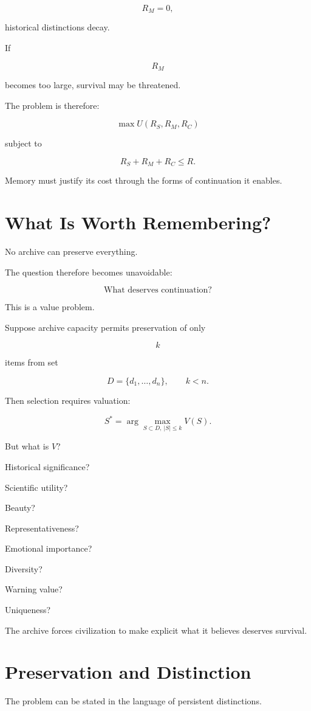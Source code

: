 \documentclass[11pt,oneside]{book}
\theoremstyle{definition}
\theoremstyle{remark}
\begin{document}
\[
R_M=0,
\]

historical distinctions decay.

If

\[
R_M
\]

becomes too large, survival may be threatened.

The problem is therefore:

\[
\max
U(R_S,R_M,R_C)
\]

subject to

\[
R_S+R_M+R_C\leq R.
\]

Memory must justify its cost through the forms of continuation it enables.

\section{What Is Worth Remembering?}

No archive can preserve everything.

The question therefore becomes unavoidable:

\[
\text{What deserves continuation?}
\]

This is a value problem.

Suppose archive capacity permits preservation of only

\[
k
\]

items from set

\[
D=\{d_1,\ldots,d_n\},
\qquad
k<n.
\]

Then selection requires valuation:

\[
S^\ast
=
\arg\max_{S\subset D,\ |S|\leq k}
V(S).
\]

But what is \(V\)?

Historical significance?

Scientific utility?

Beauty?

Representativeness?

Emotional importance?

Diversity?

Warning value?

Uniqueness?

The archive forces civilization to make explicit what it believes deserves survival.

\section{Preservation and Distinction}

The problem can be stated in the language of persistent distinctions.
\end{document}
